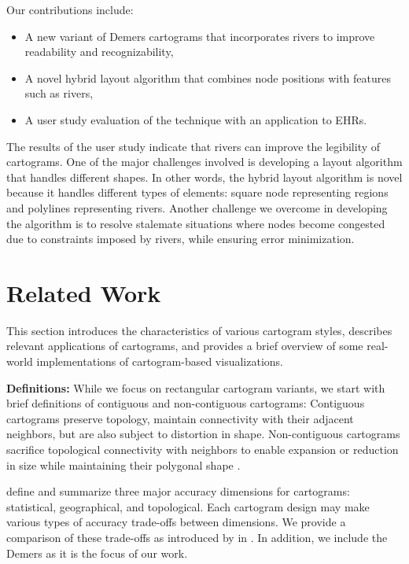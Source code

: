 \documentclass[Afour,sagev,times]{sagej}
\newcommand{\bobgraph}[1]{\noindent\textbf{#1}}
\begin{document}
Our contributions include:

\begin{itemize}
    \setlength\itemsep{0px}
    \item A new variant of Demers cartograms that incorporates rivers to improve readability and recognizability,
    \item A novel hybrid layout algorithm that combines node positions with features such as rivers,
    \item A user study evaluation of the technique with an application to EHRs.
\end{itemize}

The results of the user study indicate that rivers can improve the legibility of cartograms.
One of the major challenges involved is developing a layout algorithm that handles different shapes.
In other words, the hybrid layout algorithm is novel because it handles different types of elements: square node representing regions and polylines representing rivers.
Another challenge we overcome in developing the algorithm is to resolve stalemate situations where nodes become congested due to constraints imposed by rivers, while ensuring error minimization.

\section{Related Work}
\label{sec:RelatedWork}

This section introduces the characteristics of various cartogram styles, describes relevant applications of cartograms, and provides a brief overview of some real-world implementations of cartogram-based visualizations.

\bobgraph{Definitions: }While we focus on rectangular cartogram variants, we start with brief definitions of contiguous and non-contiguous cartograms: Contiguous cartograms preserve topology, maintain connectivity with their adjacent neighbors, but are also subject to distortion in shape.
Non-contiguous cartograms sacrifice topological connectivity with neighbors to enable expansion or reduction in size while maintaining their polygonal shape \cite{dent2009Cartography}.

\citet{nusrat2016State} define and summarize three major accuracy dimensions for cartograms: statistical, geographical, and topological.
Each cartogram design may make various types of accuracy trade-offs between dimensions.
We provide a comparison of these trade-offs as introduced by \citet{nusrat2016State} in .
In addition, we include the Demers as it is the focus of our work.
\end{document}
